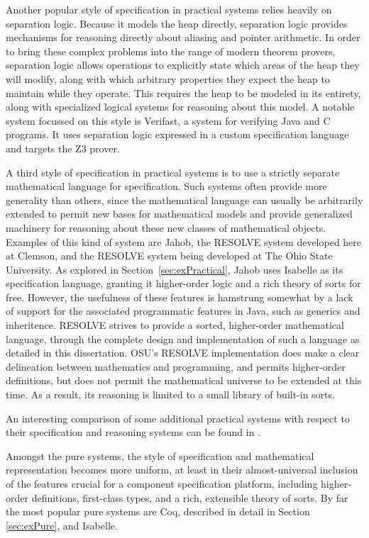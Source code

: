 Another popular style of specification in practical systems relies heavily on separation logic\cite{reynoldsSeparationLogic}.  Because it models the heap directly, separation logic provides mechanisms for reasoning directly about aliasing and pointer arithmetic.  In order to bring these complex problems into the range of modern theorem provers, separation logic allows operations to explicitly state which areas of the heap they will modify, along with which arbitrary properties they expect the heap to maintain while they operate.  This requires the heap to be modeled in its entirety, along with specialized logical systems for reasoning about this model.  A notable system focussed on this style is Verifast\cite{jacobsVerifast}, a system for verifying Java and C programs.  It uses separation logic expressed in a custom specification language and targets the Z3 prover\cite{something}.

A third style of specification in practical systems is to use a strictly separate mathematical language for specification.  Such systems often provide more generality than others, since the mathematical language can usually be arbitrarily extended to permit new bases for mathematical models and provide generalized machinery for reasoning about these new classes of mathematical objects.  Examples of this kind of system are Jahob, the RESOLVE system developed here at Clemson, and the RESOLVE system being developed at The Ohio State University.  As explored in Section~\ref{sec:exPractical}, Jahob uses Isabelle as its specification language, granting it higher-order logic and a rich theory of sorts for free.  However, the usefulness of these features is hamstrung somewhat by a lack of support for the associated programmatic features in Java, such as generics and inheritence.  RESOLVE strives to provide a sorted, higher-order mathematical language, through the complete design and implementation of such a language as detailed in this dissertation.  OSU's RESOLVE implementation does make a clear delineation between mathematics and programming, and permits higher-order definitions, but does not permit the mathematical universe to be extended at this time.  As a result, its reasoning is limited to a small library of built-in sorts.

An interesting comparison of some additional practical systems with respect to their specification and reasoning systems can be found in \cite{bisl}.

Amongst the pure systems, the style of specification and mathematical representation becomes more uniform, at least in their almost-universal inclusion of the features crucial for a component specification platform, including higher-order definitions, first-class types, and a rich, extensible theory of sorts.  By far the most popular pure systems are Coq, described in detail in Section \ref{sec:exPure}, and Isabelle.

